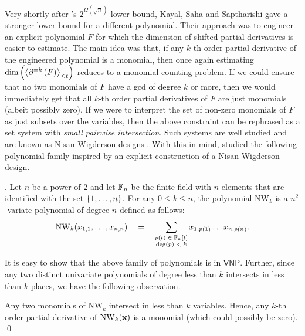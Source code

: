 \documentclass[12pt]{report}
\newcommand{\SPD}[3]{\inangle{\partial^{=#1}\inparen{#3}}_{\leq #2}}
\begin{document}
Very shortly after \cite{gkks13}'s $2^{\Omega(\sqrt{n})}$ lower bound, Kayal, Saha and Saptharishi \cite{KSS13} gave a stronger lower bound for a different polynomial. Their approach was to engineer an explicit polynomial $F$ for which the dimension of shifted partial derivatives is easier to estimate. The main idea was that, if any $k$-th order partial derivative of the engineered polynomial is a monomial, then once again estimating $\dim\inparen{\SPD{k}{\ell}{F}}$ reduces to a monomial counting problem. If we could ensure that no two monomials of $F$ have a gcd of degree $k$ or more, then we would immediately get that all $k$-th order partial derivatives of $F$ are just monomials (albeit possibly zero). If we were to interpret the set of non-zero monomials of $F$ as just subsets over the variables, then the above constraint can be rephrased as a set system with \emph{small pairwise intersection}. Such systems are well studied and are known as Nisan-Wigderson designs \cite{nw94}.  With this in mind, \cite{KSS13} studied the following polynomial family inspired by an explicit construction of a Nisan-Wigderson design. 

\begin{definition}. 
Let $n$ be a power of $2$ and let $\mathbb{F}_n$ be the finite field with $n$ elements that are identified with the set $\left\{1,\dots, n\right\}$. For any $0\leq k \leq n$, the polynomial $\mathrm{NW}_k$ is a $n^2$-variate polynomial of degree $n$ defined as follows:
$$
\mathrm{NW}_k(x_{1,1},\dots, x_{n,n}) \quad = \quad \sum_{\substack{p(t) \;\in\; \mathbb{F}_n[t]\\\deg(p) \;<\; k}} x_{1,p(1)}\dots x_{n,p(n)}.
$$
\end{definition}

It is easy to show that the above family of polynomials is in $\mathsf{VNP}$. Further, since any two distinct univariate polynomials of degree less than $k$ intersects in less than $k$ places, we have the following observation. 

\begin{observation}
Any two monomials of $\mathrm{NW}_k$ intersect in less than $k$ variables. Hence, any $k$-th order partial derivative of $\mathrm{NW}_k(\mathbf{x})$ is a monomial (which could possibly be zero). \qed
\end{observation}
\end{document}

